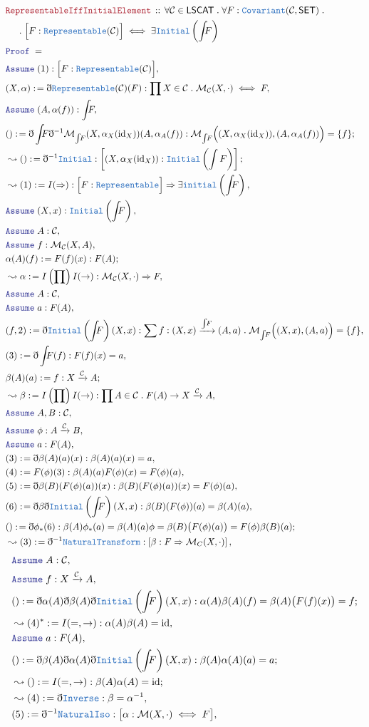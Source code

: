 \documentclass[12pt]{scrartcl}
\newcommand{\TYPE}[1]{\textcolor{NavyBlue}{\mathtt{#1}}}
\newcommand{\LOGIC}[1]{\textcolor{Blue}{\mathtt{#1}}}
\newcommand{\THM}[1]{\textcolor{Maroon}{\mathtt{#1}}}
\renewcommand{\.}{\; . \;}
\newcommand{\de}{: \kern 0.1pc =}
\newcommand{\Theorem}[2]{& \THM{#1} \, :: \, #2 \\ & \Proof = \\ }
\newcommand{\NewLine}{\\ & \kern 1pc}
\newcommand{\Page}[1]{ \begin{align*} #1 \end{align*}   }
\newcommand{ \bd }{ \ByDef }
\DeclareMathOperator*{\id}{id}
\newcommand{\Mor}{\mathcal{M}}
\newcommand{\Arrow}{\xrightarrow}
\newcommand{\Say}[3]{& #1 \de #2 : #3, \\}
\newcommand{\Conclude}[3]{& #1 \de #2 : #3; \\}
\newcommand{\Derive}[3]{& \leadsto #1 \de #2 : #3, \\}
\newcommand{\DeriveConclude}[3]{& \leadsto #1 \de #2 : #3 ; \\}
\newcommand{\Assume}[2]{& \LOGIC{Assume} \; #1 : #2, \\}
\newcommand{\ByDef}{\eth}
\newcommand{\Proof}{\LOGIC{Proof} \; }
\newcommand{\Cov}{\TYPE{Covariant}}
\newcommand{\NT}{\TYPE{NaturalTransform}}
\newcommand{\C}{\mathcal{C}}
\newcommand{\SET}{\mathsf{SET}}
\begin{document}
\Page{
	\Theorem{RepresentableIffInitialElement }{ 
		\forall \C \in \mathsf{LSCAT} \. \forall F : \Cov(\C,\SET) \. \NewLine \. 
		\Big[F : \TYPE{Representable}(\C)\Big] \iff \exists \TYPE{Initial}\left( \int \!\!\! F \right)
	}
	\Assume{(1)}{\Big[ F : \TYPE{Representable}(\C)\Big]}
	\Say{(X,\alpha)}{ \bd \TYPE{Representable}(\C)(F) }{ \prod X \in \C \. \Mor_\C(X,\cdot) \iff F  }
	\Assume{(A,\alpha(f))}{ \int \!\!\! F    }
	\Conclude{()}{\bd \int \!\!\! F \bd^{-1} \Mor_{\int \!\! F}(X, \alpha_X({\id}_X))(A,\alpha_A(f))}{
		\Mor_{\int \!\! F}\Big((X,\alpha_X({\id}_X)),(A,\alpha_A(f))\Big) = \{ f \}}
	\DeriveConclude{()}{\bd^{-1}\TYPE{Initial}}{\left[ (X, \alpha_X({\id}_X) ) : \TYPE{Initial}\left( \int F \right) \right]}
	\Derive{(1)}{I(\Rightarrow)}{\Big[F : \TYPE{Representable}\Big] \Rightarrow \exists \TYPE{initial}
		\left( \int \!\!\! F \right)}
	\Assume{(X,x)}{\TYPE{Initial}\left( \int \!\!\! F \right)}
	\Assume{A}{\C}
	\Assume{f}{\Mor_\C(X,A)}
	\Conclude{\alpha(A)(f)}{ F(f)(x)}{F(A)}
	\Derive{\alpha}{I\left(\prod\right)I(\to)}{ \Mor_\C(X,\cdot) \Rightarrow F  }
	\Assume{A}{\C}
	\Assume{a}{F(A)}
	\Say{(f,2)}{\bd \TYPE{Initial}\left( \int \!\!\! F\right)(X,x)}{\sum f : (X,x) \Arrow{\int \!\! F} (A,a) \. 
		\Mor_{\int \!\! F}\Big( (X,x),(A,a)\Big) = \{ f \}   }
	\Say{(3)}{\bd \int \!\!\! F(f)}{F(f)(x) = a}
	\Conclude{\beta(A)(a)}{f}{X \Arrow{\C} A}
	\Derive{\beta}{I\left(\prod\right)I(\to)}{\prod A \in \C \. F(A) \to X \Arrow{\C} A}
	\Assume{A,B}{\C}
	\Assume{\phi}{A \Arrow{\C} B}
	\Assume{a}{F(A)}
	\Say{(3)}{\bd \beta(A)(a)(x)}{\beta(A)(a)(x) = a}
	\Say{(4)}{F(\phi)(3)}{\beta(A)(a)F(\phi)(x) = F(\phi)(a)}
	\Say{(5)}{\bd \beta(B)(F(\phi)(a))(x)}{\beta(B)(F(\phi)(a))(x) = F(\phi)(a)}
	\Say{(6)}{\bd \beta \bd \TYPE{Initial}\left( \int \!\!\! F\right)(X,x)}{\beta(B)(F(\phi))(a) = \beta(A)(a)}
	\Conclude{()}{\bd \phi_*(6)}{ 
		\beta(A)\phi_*(a) =  \beta(A)(a)\phi 
		= \beta(B)\big( F(\phi)(a) \big)  
		= F(\phi)\beta(B)(a)
		}
	\Derive{(3)}{\bd^{-1} \NT}{\left[\beta : F \Rightarrow \Mor_C(X,\cdot) \right]}
} \Page{
	\Assume{A}{\C}
	\Assume{f}{X \Arrow{\C} A}
	\Conclude{()}{\bd \alpha(A)\bd\beta(A)\bd \TYPE{Initial}\left( \int \!\!\! F\right)(X,x) }
	{\alpha(A)\beta(A)(f) = \beta(A)\big(F(f)(x)\big) = f}
	\Derive{(4)^*}{I(=,\to)}{\alpha(A)\beta(A) = \id}
	\Assume{a}{F(A)}
	\Conclude{()}{\bd \beta(A) \bd \alpha(A) \bd \TYPE{Initial}\left( \int \!\!\! F \right)(X,x) }
	{ \beta(A)\alpha(A)(a) = a }
	\DeriveConclude{()}{ I(=,\to)}{ \beta(A)\alpha(A) = \id}
	\Derive{(4)}{\bd \TYPE{Inverse}}{\beta = \alpha^{-1}}
	\Say{(5)}{ \bd^{-1} \TYPE{NaturalIso} }{\big[\alpha : \Mor(X,\cdot) \iff F\big]}
}
\end{document}
